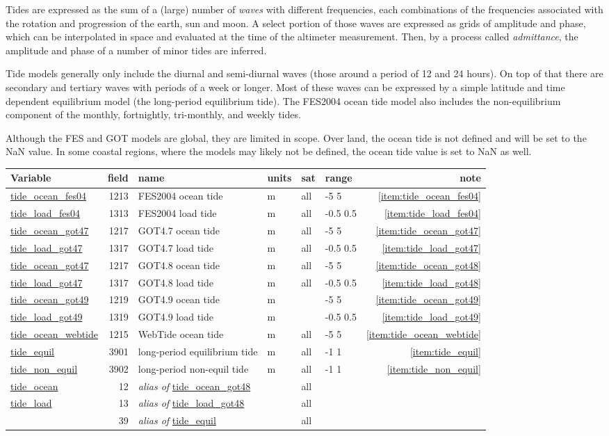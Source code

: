 \documentclass[a4paper,11pt,openany,natbib]{thesis}
\makeatletter
\newcommand\var[1]{\url{#1}\index{variables!#1@\protect\url{#1}}}
\newcommand\alias[1]{\emph{alias of} \var{#1}}
\newenvironment{vartable}{
\begin{table}[ht]
\small
\begin{tabular}{lrllllr}
\hline
Variable & field & name & units & sat & range & note \\
\hline
}{
\hline
\end{tabular}
\end{table}
}
\makeatother
\begin{document}
Tides are expressed as the sum of a (large) number of \emph{waves} with different frequencies, each combinations of the frequencies associated with the rotation and progression of the earth, sun and moon. A select portion of those waves are expressed as grids of amplitude and phase, which can be interpolated in space and evaluated at the time of the altimeter measurement. Then, by a process called \emph{admittance}, the amplitude and phase of a number of minor tides are inferred.

Tide models generally only include the diurnal and semi-diurnal waves (those around a period of 12 and 24 hours). On top of that there are secondary and tertiary waves with periods of a week or longer. Most of these waves can be expressed by a simple latitude and time dependent equilibrium model (the long-period equilibrium tide). The FES2004 ocean tide model also includes the non-equilibrium component of the monthly, fortnightly, tri-monthly, and weekly tides.

Although the FES and GOT models are global, they are limited in scope. Over land, the ocean tide is not defined and will be set to the NaN value. In some coastal regions, where the models may likely not be defined, the ocean tide value is set to NaN as well.

\begin{vartable}
\var{tide_ocean_fes04} & 1213 & FES2004 ocean tide & m & all & -5 5 & \ref{item:tide_ocean_fes04} \\
\var{tide_load_fes04}  & 1313 & FES2004 load  tide & m & all & -0.5 0.5 & \ref{item:tide_load_fes04} \\
\var{tide_ocean_got47} & 1217 & GOT4.7  ocean tide & m & all & -5 5 & \ref{item:tide_ocean_got47} \\
\var{tide_load_got47}  & 1317 & GOT4.7  load  tide & m & all & -0.5 0.5 & \ref{item:tide_load_got47} \\
\var{tide_ocean_got47} & 1217 & GOT4.8  ocean tide & m & all & -5 5 & \ref{item:tide_ocean_got48} \\
\var{tide_load_got47}  & 1317 & GOT4.8  load  tide & m & all & -0.5 0.5 & \ref{item:tide_load_got48} \\
\var{tide_ocean_got49} & 1219 & GOT4.9  ocean tide & m & & -5 5 & \ref{item:tide_ocean_got49} \\
\var{tide_load_got49}  & 1319 & GOT4.9  load  tide & m & & -0.5 0.5 & \ref{item:tide_load_got49} \\
\var{tide_ocean_webtide} & 1215 & WebTide ocean tide & m & all & -5 5 & \ref{item:tide_ocean_webtide} \\
\var{tide_equil}       & 3901 & long-period equilibrium tide & m & all & -1 1 & \ref{item:tide_equil} \\
\var{tide_non_equil}   & 3902 & long-period non-equil tide & m & all & -1 1 & \ref{item:tide_non_equil} \\
\hline
\var{tide_ocean} & 12 & \alias{tide_ocean_got48} && all && \\
\var{tide_load}  & 13 & \alias{tide_load_got48} && all && \\
                 & 39 & \alias{tide_equil} && all && \\
\end{vartable}
\end{document}

